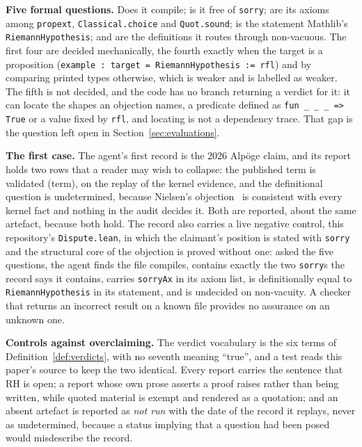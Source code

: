 \documentclass[11pt,a4paper]{article}
\newcommand{\RH}{\mathrm{RH}}
\newcommand{\verdict}[1]{\textsf{#1}}
\begin{document}
\textbf{Five formal questions.} Does it compile; is it free of \texttt{sorry}; are its
axioms among \texttt{propext}, \texttt{Classical.choice} and \texttt{Quot.sound}; is the statement
Mathlib's \texttt{RiemannHypothesis}; and are the definitions it routes through non-vacuous. The
first four are decided mechanically, the fourth exactly when the target is a proposition
(\texttt{example : target = RiemannHypothesis := rfl}) and by comparing printed types otherwise,
which is weaker and is labelled as weaker. The fifth is not decided, and the code has no branch
returning a verdict for it: it can locate the shapes an objection names, a predicate defined as
\texttt{fun \_ \_ \_ => True} or a value fixed by \texttt{rfl}, and locating is not a dependency
trace. That gap is the question left open in Section~\ref{sec:evaluations}.

\textbf{The first case.} The agent's first record is the 2026 Alp\"oge claim, and its
report holds two rows that a reader may wish to collapse: the published term is
\verdict{validated (term)}, on the replay of the kernel evidence, and the definitional question is
\verdict{undetermined}, because Nielsen's objection~\cite{nielsen} is consistent with every kernel
fact and nothing in the audit decides it. Both are reported, about the same artefact, because both
hold. The record also carries a live negative control, this repository's \texttt{Dispute.lean}, in
which the claimant's position is stated with \texttt{sorry} and the structural core of the
objection is proved without one: asked the five questions, the agent finds the file compiles,
contains exactly the two \texttt{sorry}s the record says it contains, carries \texttt{sorryAx} in
its axiom list, is definitionally equal to \texttt{RiemannHypothesis} in its statement, and is
undecided on non-vacuity. A checker that returns an incorrect result on a known file provides no
assurance on an unknown one.

\textbf{Controls against overclaiming.} The verdict vocabulary is the six terms of
Definition~\ref{def:verdicts}, with no seventh meaning ``true'', and a test reads this paper's
source to keep the two identical. Every report carries the sentence that $\RH$ is open; a report
whose own prose asserts a proof raises rather than being written, while quoted material is exempt
and rendered as a quotation; and an absent artefact is reported as \emph{not run} with the date of
the record it replays, never as \verdict{undetermined}, because a status implying that a question
had been posed would misdescribe the record.
\end{document}
